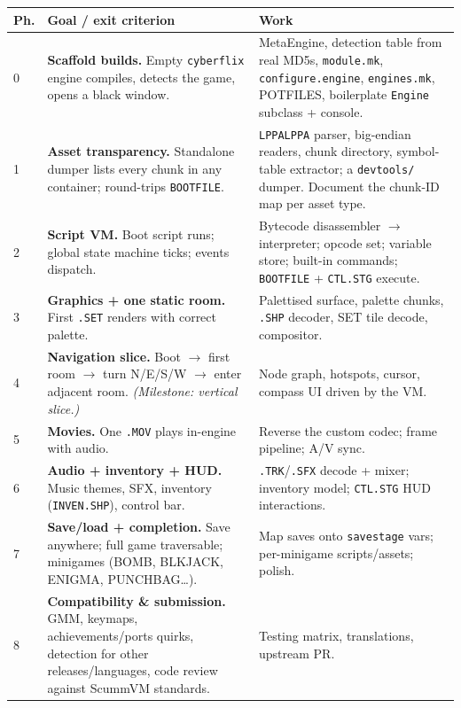 \documentclass[11pt]{article}
\newcommand{\code}[1]{\texttt{#1}}
\begin{document}
\begin{longtable}{@{}p{0.7cm}p{5.3cm}p{8.2cm}@{}}
\toprule
Ph. & Goal / exit criterion & Work \\
\midrule
0 & \textbf{Scaffold builds.} Empty \code{cyberflix} engine compiles, detects
    the game, opens a black window. & MetaEngine, detection table from real
    MD5s, \code{module.mk}, \code{configure.engine}, \code{engines.mk}, POTFILES,
    boilerplate \code{Engine} subclass + console. \\
1 & \textbf{Asset transparency.} Standalone dumper lists every chunk in any
    container; round-trips \code{BOOTFILE}. & \code{LPPALPPA} parser,
    big-endian readers, chunk directory, symbol-table extractor; a
    \code{devtools/} dumper. Document the chunk-ID map per asset type. \\
2 & \textbf{Script VM.} Boot script runs; global state machine ticks; events
    dispatch. & Bytecode disassembler $\rightarrow$ interpreter; opcode set;
    variable store; built-in commands; \code{BOOTFILE} + \code{CTL.STG}
    execute. \\
3 & \textbf{Graphics + one static room.} First \code{.SET} renders with correct
    palette. & Palettised surface, palette chunks, \code{.SHP} decoder, SET tile
    decode, compositor. \\
4 & \textbf{Navigation slice.} Boot $\rightarrow$ first room $\rightarrow$ turn
    N/E/S/W $\rightarrow$ enter adjacent room. \emph{(Milestone: vertical
    slice.)} & Node graph, hotspots, cursor, compass UI driven by the VM. \\
5 & \textbf{Movies.} One \code{.MOV} plays in-engine with audio. & Reverse the
    custom codec; frame pipeline; A/V sync. \\
6 & \textbf{Audio + inventory + HUD.} Music themes, SFX, inventory
    (\code{INVEN.SHP}), control bar. & \code{.TRK}/\code{.SFX} decode + mixer;
    inventory model; \code{CTL.STG} HUD interactions. \\
7 & \textbf{Save/load + completion.} Save anywhere; full game traversable;
    minigames (BOMB, BLKJACK, ENIGMA, PUNCHBAG\dots). & Map saves onto
    \code{savestage} vars; per-minigame scripts/assets; polish. \\
8 & \textbf{Compatibility \& submission.} GMM, keymaps, achievements/ports
    quirks, detection for other releases/languages, code review against ScummVM
    standards. & Testing matrix, translations, upstream PR. \\
\bottomrule
\end{longtable}
\end{document}
